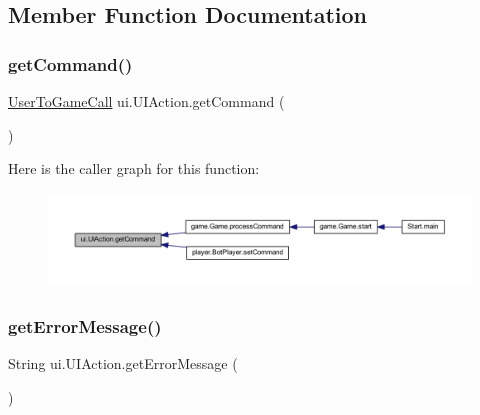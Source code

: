 \subsection{Member Function Documentation}
\mbox{\label{classui_1_1_u_i_action_ac7b5e31f70cc4b49fad7e9d08b82e783}} 
\subsubsection{\texorpdfstring{get\+Command()}{getCommand()}}
{\footnotesize\ttfamily \mbox{\hyperlink{enumui_1_1commands_1_1_user_to_game_call}{User\+To\+Game\+Call}} ui.\+U\+I\+Action.\+get\+Command (\begin{DoxyParamCaption}{ }\end{DoxyParamCaption})\hspace{0.3cm}{\ttfamily [inline]}}

Here is the caller graph for this function\+:
\nopagebreak
\begin{figure}[H]
\begin{center}
\leavevmode
\includegraphics[width=350pt]{classui_1_1_u_i_action_ac7b5e31f70cc4b49fad7e9d08b82e783_icgraph}
\end{center}
\end{figure}
\mbox{\label{classui_1_1_u_i_action_a2fefd7ed6431b92c2215776bf64552b0}} 
\subsubsection{\texorpdfstring{get\+Error\+Message()}{getErrorMessage()}}
{\footnotesize\ttfamily String ui.\+U\+I\+Action.\+get\+Error\+Message (\begin{DoxyParamCaption}{ }\end{DoxyParamCaption})\hspace{0.3cm}{\ttfamily [inline]}}

